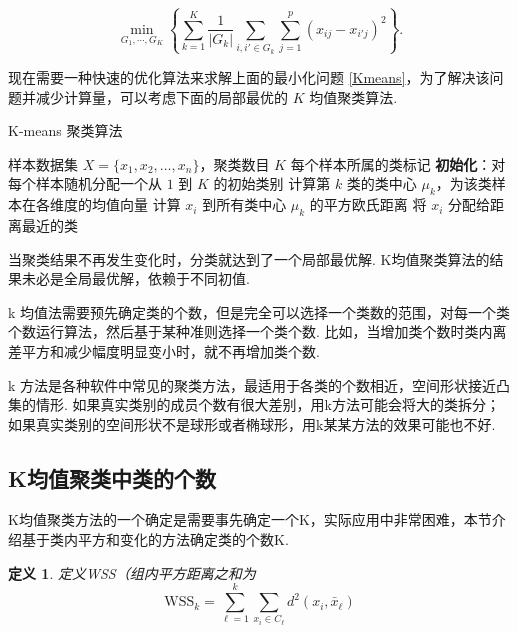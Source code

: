 \documentclass[12pt, a4paper, oneside]{ctexart}
\newtheorem{definition}[theorem]{定义}
\begin{document}
	\begin{equation}
		\min_{G_1, \cdots, G_K} \left\{ \sum_{k=1}^{K} \frac{1}{|G_k|} \sum_{i,i' \in G_k} \sum_{j=1}^{p} (x_{ij} - x_{i'j})^2 \right\}.
		\label{Kmeans}
	\end{equation}
	
	现在需要一种快速的优化算法来求解上面的最小化问题 \eqref{Kmeans}，为了解决该问题并减少计算量，可以考虑下面的局部最优的 $K$ 均值聚类算法.
	\begin{algorithm}
		\caption{K-means 聚类算法}
		\begin{algorithmic}[1]
			\Require 样本数据集 $X = \{x_1, x_2, \dots, x_n\}$，聚类数目 $K$
			\Ensure 每个样本所属的类标记
			\State \textbf{初始化}：对每个样本随机分配一个从 $1$ 到 $K$ 的初始类别
			\Repeat
			\State 计算第 $k$ 类的类中心 $\mu_k$，为该类样本在各维度的均值向量
			\EndFor
			\State 计算 $x_i$ 到所有类中心 $\mu_k$ 的平方欧氏距离
			\State 将 $x_i$ 分配给距离最近的类
			\EndFor
		\end{algorithmic}
	\end{algorithm}
	
	当聚类结果不再发生变化时，分类就达到了一个局部最优解. K均值聚类算法的结果未必是全局最优解，依赖于不同初值.
	
	k 均值法需要预先确定类的个数，但是完全可以选择一个类数的范围，对每一个类个数运行算法，然后基于某种准则选择一个类个数. 比如，当增加类个数时类内离差平方和减少幅度明显变小时，就不再增加类个数.
	
	k 方法是各种软件中常见的聚类方法，最适用于各类的个数相近，空间形状接近凸集的情形. 如果真实类别的成员个数有很大差别，用k方法可能会将大的类拆分；如果真实类别的空间形状不是球形或者椭球形，用k某某方法的效果可能也不好.
	
	\subsection{K均值聚类中类的个数}
	K均值聚类方法的一个确定是需要事先确定一个K，实际应用中非常困难，本节介绍基于类内平方和变化的方法确定类的个数K.
	
	\begin{definition}
		定义WSS（组内平方距离之和为
		\begin{equation}
			\mathrm{WSS}_k = \sum_{\ell=1}^{k} \sum_{x_i \in C_\ell} d^2(x_i, \bar{x}_\ell)
			\label{WSS1}
		\end{equation}
		
	\end{definition}
	
\end{document}
